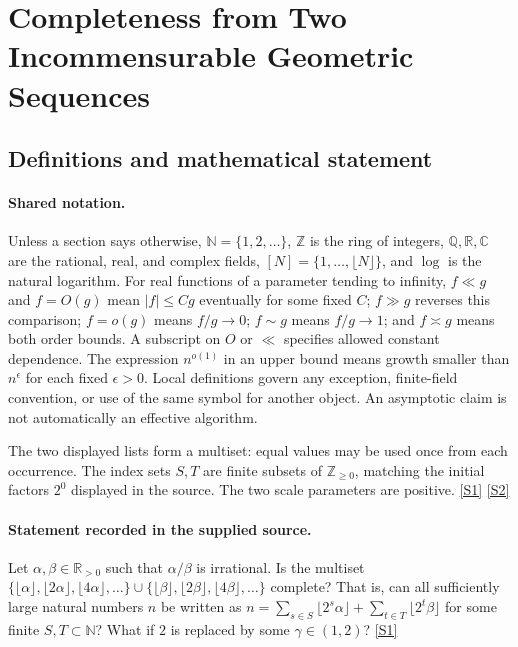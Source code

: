\documentclass[11pt,a4paper]{article}
\newcommand{\N}{\mathbb{N}}
\newcommand{\Z}{\mathbb{Z}}
\newcommand{\Q}{\mathbb{Q}}
\newcommand{\R}{\mathbb{R}}
\newcommand{\C}{\mathbb{C}}
\newcommand{\sref}[2]{\hyperlink{source:#1:#2}{[S#2]}}
\begin{document}
\section{Completeness from Two Incommensurable Geometric Sequences}\label{statement}


\subsection{Definitions and mathematical statement}

\paragraph{Shared notation.}Unless a section says otherwise, $\N=\{1,2,\ldots\}$,
$\Z$ is the ring of integers, $\Q,\R,\C$ are the rational, real, and complex
fields, $[N]=\{1,\ldots,\lfloor N\rfloor\}$, and $\log$ is the natural
logarithm. For real functions of a parameter tending to infinity,
$f\ll g$ and $f=O(g)$ mean $|f|\leq Cg$ eventually for some fixed $C$;
$f\gg g$ reverses this comparison; $f=o(g)$ means $f/g\to0$;
$f\sim g$ means $f/g\to1$; and $f\asymp g$ means both order bounds.
A subscript on $O$ or $\ll$ specifies allowed constant dependence.
The expression $n^{o(1)}$ in an upper bound means growth smaller than
$n^\epsilon$ for each fixed $\epsilon>0$. Local definitions govern any
exception, finite-field convention, or use of the same symbol for another
object. An asymptotic claim is not automatically an effective algorithm.



The two displayed lists form a multiset: equal values may be used once from each occurrence. The index sets $S,T$ are finite subsets of $\Z_{\geq0}$, matching the initial factors $2^0$ displayed in the source. The two scale parameters are positive. \sref{statement}{1} \sref{statement}{2}

\paragraph{Statement recorded in the supplied source.}
Let $\alpha,\beta\in \mathbb{R}_{>0}$ such that $\alpha/\beta$ is irrational. Is the multiset $ \{ \lfloor \alpha\rfloor,\lfloor 2\alpha\rfloor,\lfloor 4\alpha\rfloor,\ldots\}\cup \{ \lfloor \beta\rfloor,\lfloor 2\beta\rfloor,\lfloor 4\beta\rfloor,\ldots\} $ complete? That is, can all sufficiently large natural numbers $n$ be written as $ n=\sum_{s\in S}\lfloor 2^s\alpha\rfloor+\sum_{t\in T}\lfloor 2^t\beta\rfloor $ for some finite $S,T\subset \mathbb{N}$?
What if $2$ is replaced by some $\gamma\in(1,2)$? \sref{statement}{1}
\end{document}
